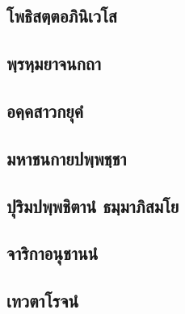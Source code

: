 \documentclass[
]{book}
\begin{document}
\hypertarget{uxe42uxe1euxe18uxe34uxe2auxe15uxe3auxe15uxe2duxe20uxe34uxe19uxe34uxe40uxe27uxe42uxe2a}{%
\subsection{โพธิสตฺตอภินิเวโส}\label{uxe42uxe1euxe18uxe34uxe2auxe15uxe3auxe15uxe2duxe20uxe34uxe19uxe34uxe40uxe27uxe42uxe2a}}

\hypertarget{uxe1euxe3auxe23uxe2buxe3auxe21uxe22uxe32uxe08uxe19uxe01uxe16uxe32}{%
\subsection{พฺรหฺมยาจนกถา}\label{uxe1euxe3auxe23uxe2buxe3auxe21uxe22uxe32uxe08uxe19uxe01uxe16uxe32}}

\hypertarget{uxe2duxe04uxe3auxe04uxe2auxe32uxe27uxe01uxe22uxe38uxe04uxe4d}{%
\subsection{อคฺคสาวกยุคํ}\label{uxe2duxe04uxe3auxe04uxe2auxe32uxe27uxe01uxe22uxe38uxe04uxe4d}}

\hypertarget{uxe21uxe2buxe32uxe0auxe19uxe01uxe32uxe22uxe1buxe1euxe3auxe1euxe0auxe3auxe0auxe32}{%
\subsection{มหาชนกายปพฺพชฺชา}\label{uxe21uxe2buxe32uxe0auxe19uxe01uxe32uxe22uxe1buxe1euxe3auxe1euxe0auxe3auxe0auxe32}}

\hypertarget{uxe1buxe38uxe23uxe34uxe21uxe1buxe1euxe3auxe1euxe0auxe34uxe15uxe32uxe19uxe4d-uxe18uxe21uxe3auxe21uxe32uxe20uxe34uxe2auxe21uxe42uxe22}{%
\subsection{ปุริมปพฺพชิตานํ ธมฺมาภิสมโย}\label{uxe1buxe38uxe23uxe34uxe21uxe1buxe1euxe3auxe1euxe0auxe34uxe15uxe32uxe19uxe4d-uxe18uxe21uxe3auxe21uxe32uxe20uxe34uxe2auxe21uxe42uxe22}}

\hypertarget{uxe08uxe32uxe23uxe34uxe01uxe32uxe2duxe19uxe38uxe0auxe32uxe19uxe19uxe4d}{%
\subsection{จาริกาอนุชานนํ}\label{uxe08uxe32uxe23uxe34uxe01uxe32uxe2duxe19uxe38uxe0auxe32uxe19uxe19uxe4d}}

\hypertarget{uxe40uxe17uxe27uxe15uxe32uxe42uxe23uxe08uxe19uxe4d}{%
\subsection{เทวตาโรจนํ}\label{uxe40uxe17uxe27uxe15uxe32uxe42uxe23uxe08uxe19uxe4d}}
\end{document}
